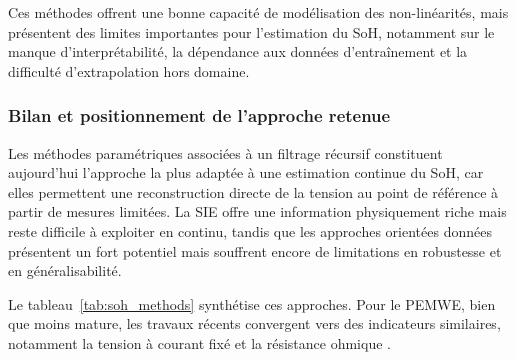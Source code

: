 Ces méthodes offrent une bonne capacité de modélisation des non-linéarités, mais présentent des limites importantes pour l'estimation du SoH, notamment sur le manque d'interprétabilité, la dépendance aux données d'entraînement et la difficulté d'extrapolation hors domaine. 


\subsubsection{Bilan et positionnement de l'approche retenue}

Les méthodes paramétriques associées à un filtrage récursif constituent aujourd'hui l'approche la plus adaptée à une estimation continue du SoH, car elles permettent une reconstruction directe de la tension au point de référence à partir de mesures limitées. La SIE offre une information physiquement riche mais reste difficile à exploiter en continu, tandis que les approches orientées données présentent un fort potentiel mais souffrent encore de limitations en robustesse et en généralisabilité.

Le tableau~\ref{tab:soh_methods} synthétise ces approches. Pour le PEMWE, bien que moins mature, les travaux récents convergent vers des indicateurs similaires, notamment la tension à courant fixé et la résistance ohmique \cite{dittmar_prognostics_2025}\cite{makhsoos_proton_2025}.

